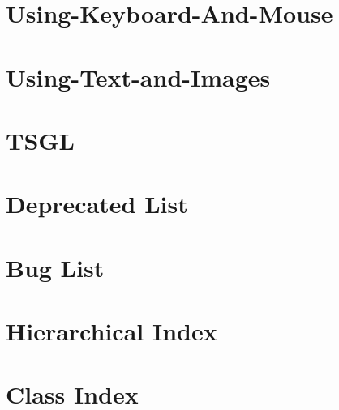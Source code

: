 \documentclass[twoside]{book}
\begin{document}
\chapter{Using-\/\-Keyboard-\/\-And-\/\-Mouse}
\label{md__home_kodemonkey_workspace__t_s_g_l_docs-wiki__using-_keyboard-_and-_mouse}
\hypertarget{md__home_kodemonkey_workspace__t_s_g_l_docs-wiki__using-_keyboard-_and-_mouse}{}

\chapter{Using-\/\-Text-\/and-\/\-Images}
\label{md__home_kodemonkey_workspace__t_s_g_l_docs-wiki__using-_text-and-_images}
\hypertarget{md__home_kodemonkey_workspace__t_s_g_l_docs-wiki__using-_text-and-_images}{}

\chapter{T\-S\-G\-L}
\label{md__home_kodemonkey_workspace__t_s_g_l_readme}
\hypertarget{md__home_kodemonkey_workspace__t_s_g_l_readme}{}

\chapter{Deprecated List}
\label{deprecated}
\hypertarget{deprecated}{}

\chapter{Bug List}
\label{bug}
\hypertarget{bug}{}

\chapter{Hierarchical Index}

\chapter{Class Index}

\end{document}
